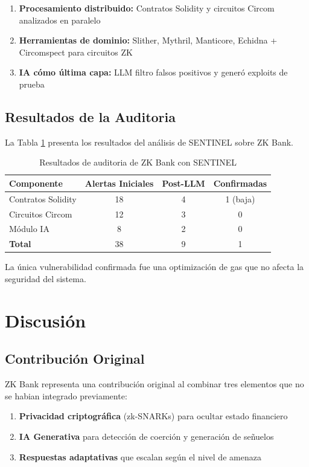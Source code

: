\documentclass[12pt,a4paper,twoside]{book}
\begin{document}
\begin{enumerate}
    \item \textbf{Procesamiento distribuido:} Contratos Solidity y circuitos Circom analizados en paralelo
    \item \textbf{Herramientas de dominio:} Slither, Mythril, Manticore, Echidna + Circomspect para circuitos ZK
    \item \textbf{IA cómo última capa:} LLM filtro falsos positivos y generó exploits de prueba
\end{enumerate}

\subsection{Resultados de la Auditoria}

La Tabla \ref{tab:auditoria_zkbank} presenta los resultados del análisis de SENTINEL sobre ZK Bank.

\begin{table}[h]
\centering
\caption{Resultados de auditoria de ZK Bank con SENTINEL}
\label{tab:auditoria_zkbank}
\begin{tabular}{lccc}
\toprule
\textbf{Componente} & \textbf{Alertas Iniciales} & \textbf{Post-LLM} & \textbf{Confirmadas} \\
\midrule
Contratos Solidity & 18 & 4 & 1 (baja) \\
Circuitos Circom & 12 & 3 & 0 \\
Módulo IA & 8 & 2 & 0 \\
\midrule
\textbf{Total} & 38 & 9 & 1 \\
\bottomrule
\end{tabular}
\end{table}

La única vulnerabilidad confirmada fue una optimización de gas que no afecta la seguridad del sistema.

\section{Discusión}

\subsection{Contribución Original}

ZK Bank representa una contribución original al combinar tres elementos que no se habian integrado previamente:

\begin{enumerate}
    \item \textbf{Privacidad criptográfica} (zk-SNARKs) para ocultar estado financiero
    \item \textbf{IA Generativa} para detección de coerción y generación de señuelos
    \item \textbf{Respuestas adaptativas} que escalan según el nivel de amenaza
\end{enumerate}
\end{document}
